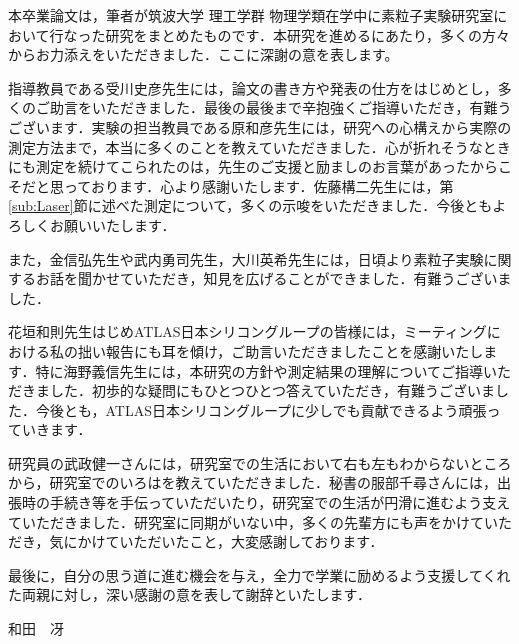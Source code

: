 \begin{acknowledgment}
本卒業論文は，筆者が筑波大学 理工学群 物理学類在学中に素粒子実験研究室において行なった研究をまとめたものです．本研究を進めるにあたり，多くの方々からお力添えをいただきました．ここに深謝の意を表します。\par
指導教員である受川史彦先生には，論文の書き方や発表の仕方をはじめとし，多くのご助言をいただきました．最後の最後まで辛抱強くご指導いただき，有難うございます．実験の担当教員である原和彦先生には，研究への心構えから実際の測定方法まで，本当に多くのことを教えていただきました．心が折れそうなときにも測定を続けてこられたのは，先生のご支援と励ましのお言葉があったからこそだと思っております．心より感謝いたします．佐藤構二先生には，第\ref{sub:Laser}節に述べた測定について，多くの示唆をいただきました．今後ともよろしくお願いいたします．\par
また，金信弘先生や武内勇司先生，大川英希先生には，日頃より素粒子実験に関するお話を聞かせていただき，知見を広げることができました．有難うございました．\par
花垣和則先生はじめATLAS日本シリコングループの皆様には，ミーティングにおける私の拙い報告にも耳を傾け，ご助言いただきましたことを感謝いたします．特に海野義信先生には，本研究の方針や測定結果の理解についてご指導いただきました．初歩的な疑問にもひとつひとつ答えていただき，有難うございました．今後とも，ATLAS日本シリコングループに少しでも貢献できるよう頑張っていきます．\par
研究員の武政健一さんには，研究室での生活において右も左もわからないところから，研究室でのいろはを教えていただきました．秘書の服部千尋さんには，出張時の手続き等を手伝っていただいたり，研究室での生活が円滑に進むよう支えていただきました．研究室に同期がいない中，多くの先輩方にも声をかけていただき，気にかけていただいたこと，大変感謝しております．\par
最後に，自分の思う道に進む機会を与え，全力で学業に励めるよう支援してくれた両親に対し，深い感謝の意を表して謝辞といたします．
\begin{flushright}
和田　冴
\end{flushright}
\end{acknowledgment}